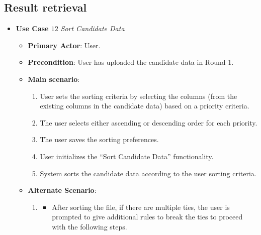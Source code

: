 \documentclass{report}
\begin{document}
\subsection{Result retrieval}
\begin{tcolorbox}[colframe=white, colback=lightred, arc=8pt]

\begin{itemize}
    \item \textbf{Use Case $12$} \textit{Sort Candidate Data
}\\
    \begin{itemize}
        \item \textbf{Primary Actor}: User.
        \item \textbf{Precondition}: User has uploaded the candidate data in Round 1.
        \item \textbf{Main scenario}: \begin{enumerate}
            \item User sets the sorting criteria by selecting the columns (from the existing columns in the candidate data) based on a priority criteria. 
            \item The user selects either ascending or descending order for each priority.
            \item The user saves the sorting preferences.
            \item User initializes the “Sort Candidate Data” functionality.
            \item System sorts the candidate data according to the user sorting criteria.
        \end{enumerate}
       \item \textbf{Alternate Scenario}: 
       \begin{enumerate}
           \item 
           \begin{itemize} 
           \item After sorting the file, if there are multiple ties, the user is prompted to give additional rules to break the ties to proceed with the following steps.
           \end{itemize}
       \end{enumerate}
    \end{itemize}
\end{itemize}


\end{tcolorbox}
\end{document}

